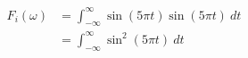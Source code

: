 \documentclass[preview]{standalone}
\begin{document}
\begin{align*}
F_{i}(\omega)&=\int_{-\infty}^{\infty}\sin{(5\pi t)}\sin{(5\pi t)} \ dt \\ &=\int_{-\infty}^{\infty}\sin^{2}{(5\pi t)} \ dt
\end{align*}
\end{document}
